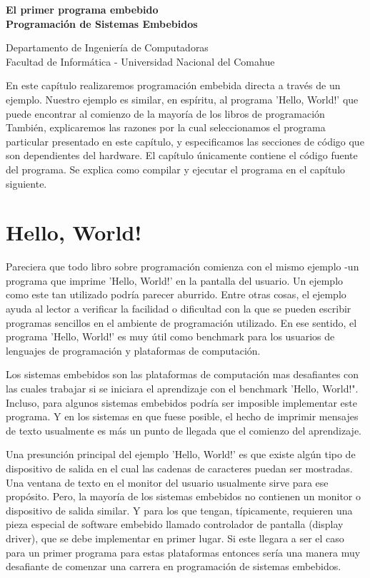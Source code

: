 \documentclass[12pt]{article}
\def\maketitle{

 \makeatletter
 {\color{bl} \centering \huge \sc \textbf{
 El primer programa embebido\\ 
\large \vspace*{-8pt} \color{black} Programación de Sistemas Embebidos
 \vspace*{8pt} }\par}
 \makeatother


 \makeatletter
 {\centering \small 
 	Departamento de Ingeniería de Computadoras \\
 	Facultad de Informática - Universidad Nacional del Comahue \\
 	\vspace{20pt} }
 \makeatother

}
\begin{document}
\thispagestyle{empty}
\maketitle
\setlength{\parindent}{0pt}



En este capítulo realizaremos programación embebida directa a través de un ejemplo.
Nuestro ejemplo es similar, en espíritu, al programa 'Hello, World!' que puede encontrar al comienzo de la mayoría de los libros de programación
También, explicaremos las razones por la cual seleccionamos el programa particular
presentado en este capítulo, y especificamos las secciones de código que son dependientes del hardware.
El capítulo únicamente contiene el código fuente del programa. Se explica como compilar y ejecutar el programa en el capítulo siguiente.

\section *{Hello, World!}

Pareciera que todo libro sobre programación comienza con el mismo ejemplo -un programa que imprime 'Hello, World!' en la pantalla del usuario. Un ejemplo como este tan utilizado podría parecer aburrido.
Entre otras cosas, el ejemplo ayuda al lector a verificar la facilidad o dificultad con la que se pueden escribir programas sencillos en el ambiente de programación utilizado. En ese sentido, el programa 'Hello, World!' es muy útil como benchmark para los usuarios de lenguajes de programación y plataformas de computación.

Los sistemas embebidos son las plataformas de computación mas desafiantes con las cuales trabajar si se iniciara el aprendizaje con el benchmark 'Hello, World!". Incluso, para algunos sistemas embebidos podría ser imposible implementar este programa. Y en los sistemas en que fuese posible, el hecho de imprimir mensajes de texto usualmente es más un punto de llegada que el comienzo del aprendizaje.

Una presunción principal del ejemplo 'Hello, World!' es que existe algún tipo de dispositivo de salida en el cual las cadenas de caracteres puedan ser mostradas. Una ventana de texto en el monitor del usuario usualmente sirve para ese propósito. Pero, la mayoría de los sistemas embebidos no contienen un monitor o dispositivo de salida similar. Y para los que tengan, típicamente, requieren una pieza especial de software embebido llamado controlador de pantalla (display driver), que se debe implementar en primer lugar. Si este llegara a ser el caso para un primer programa para estas plataformas entonces sería una manera muy desafiante de comenzar una carrera en programación de sistemas embebidos.
\end{document}
